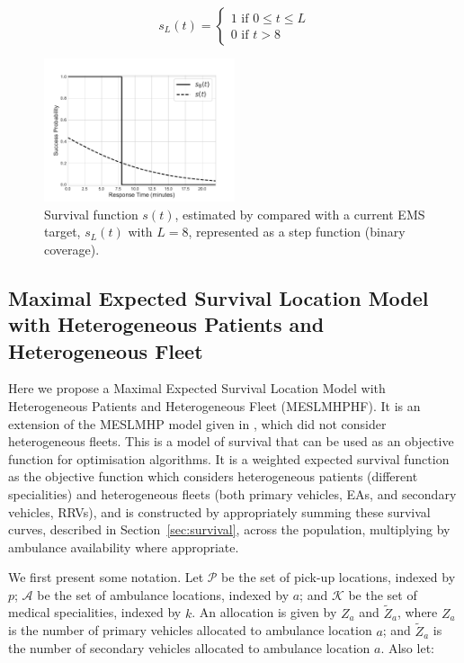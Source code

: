 \documentclass[preprint,12pt]{elsarticle}
\begin{document}
\begin{equation}\label{eqn:survival_cutoff}
    s_L(t) = \begin{cases} 
    1 \text{ if } 0\leq t \leq L \\
    0 \text{ if } t > 8 
    \end{cases}
\end{equation}

\begin{figure}[ht]
\centering
  \includegraphics[width=0.5\textwidth]{img/Survival_Function.pdf}
    \caption{Survival function $s(t)$, estimated by \cite{Valenzuela20001206}
             compared with a current EMS target, $s_L(t)$ with $L=8$,
             represented as a step function (binary coverage).}
  \label{fig:survivalfunction}
\end{figure}


\subsection{Maximal Expected Survival Location Model with Heterogeneous
            Patients and Heterogeneous Fleet}\label{sec:meslmhphf}
Here we propose a Maximal Expected Survival Location Model with Heterogeneous
Patients and Heterogeneous Fleet (MESLMHPHF). It is an extension of the
MESLMHP model given in \cite{Knight2012918}, which did not consider
heterogeneous fleets. This is a model of survival that can be used as an
objective function for optimisation algorithms. It is a weighted expected
survival function as the objective function which considers heterogeneous
patients (different specialities) and heterogeneous fleets (both primary
vehicles, EAs, and secondary vehicles, RRVs), and is constructed by
appropriately summing these survival curves, described in
Section~\ref{sec:survival}, across the population, multiplying by ambulance
availability where appropriate.

We first present some notation. Let $\mathcal{P}$ be the set of pick-up
locations, indexed by $p$; $\mathcal{A}$ be the set of ambulance locations,
indexed by $a$; and $\mathcal{K}$ be the set of medical specialities, indexed
by $k$.
An allocation is given by $Z_a$ and $\tilde{Z}_a$, where $Z_a$ is the number
of primary vehicles allocated to ambulance location $a$; and $\tilde{Z}_a$ is
the number of secondary vehicles allocated to ambulance location $a$. Also
let:
\end{document}
